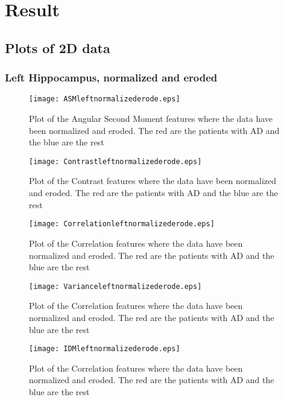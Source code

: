 \chapter{Result}

\section{Plots of 2D data}

\subsection{Left Hippocampus, normalized and eroded}

\begin{figure}[H]
  \centering
  \texttt{[image: ASMleftnormalizederode.eps]}
  \caption{Plot of the Angular Second Moment features where the data have been normalized and eroded. The red are the patients with AD and the blue are the rest}\label{fig:ASMLeftNormalizedEroded}
\end{figure}

\begin{figure}[H]
  \centering
  \texttt{[image: Contrastleftnormalizederode.eps]}
  \caption{Plot of the Contrast features where the data have been normalized and eroded. The red are the patients with AD and the blue are the rest}\label{fig:ContrastLeftNormalizedEroded}
\end{figure}

\begin{figure}[H]
  \centering
  \texttt{[image: Correlationleftnormalizederode.eps]}
  \caption{Plot of the Correlation features where the data have been normalized and eroded. The red are the patients with AD and the blue are the rest}\label{fig:ContrastLeftNormalizedEroded}
\end{figure}

\begin{figure}[H]
  \centering
  \texttt{[image: Varianceleftnormalizederode.eps]}
  \caption{Plot of the Correlation features where the data have been normalized and eroded. The red are the patients with AD and the blue are the rest}\label{fig:ContrastLeftNormalizedEroded}
\end{figure}

\begin{figure}[H]
  \centering
  \texttt{[image: IDMleftnormalizederode.eps]}
  \caption{Plot of the Correlation features where the data have been normalized and eroded. The red are the patients with AD and the blue are the rest}\label{fig:ContrastLeftNormalizedEroded}
\end{figure}

